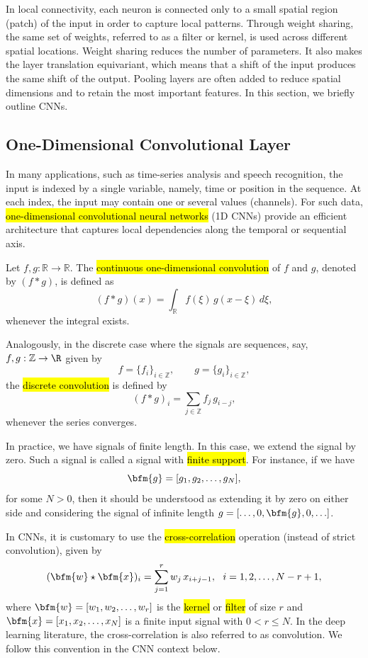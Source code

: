 In local connectivity, each neuron is connected only to a small spatial region (patch) of the input in order to capture local patterns.  Through weight sharing, the same set of weights, referred to as a filter or kernel,  is used across different spatial locations. Weight sharing reduces the number of parameters. It also makes the layer translation equivariant, which means that a shift of the input produces the same shift of the output.  Pooling layers are often added to reduce spatial dimensions and to retain the most important features.  In this section, we briefly outline CNNs.
\subsection{One-Dimensional Convolutional Layer}
In many applications, such as time-series analysis and speech recognition, the input is indexed by a single variable, namely, time or position in the sequence.  At each index, the input may contain one or several values (channels).  For such data, \hl{one-dimensional convolutional neural networks} (1D CNNs) provide an efficient architecture that captures local dependencies along the temporal or sequential axis.

Let $f, g : \mathbb{R} \to \mathbb{R}$. 
The \hl{continuous one-dimensional convolution} of $f$ and $g$, denoted by $(f * g)$, is defined as
$$
(f * g)(x) = \int_{\mathbb{R}} f(\xi)\, g(x - \xi)\, d\xi,
$$
whenever the integral exists.

Analogously, in the discrete case where the signals are sequences, say, $f,g:\mathbb{Z}\rightarrow \R$ given by
$$
f = \{f_i\}_{i \in \mathbb{Z}}, 
\qquad 
g = \{g_i\}_{i \in \mathbb{Z}},
$$
the \hl{discrete convolution} is defined by
$$
(f * g)_i = \sum_{j \in \mathbb{Z}} f_j \, g_{i - j},
$$
whenever the series converges.
\begin{remark}

In practice, we have signals of finite length.  In this case, we extend the signal by zero. Such a signal is called a signal with \hl{finite support}.  For instance, if we have 
$$\bfm{g}=[g_1, g_2, \ldots, g_{N}],$$ 
for some $N>0$, then it should be understood as extending it by zero on either side and considering the signal of infinite length $g=[\ldots, 0, \bfm{g}, 0, \ldots]$.
\end{remark}
In CNNs, it is customary to use the \hl{cross-correlation} operation (instead of strict convolution), given by
$$
(\bfm{w} \star \bfm{x})_i = \sum_{j = 1}^{r}  w_j\, x_{i + j - 1}, ~~
i = 1, 2, \ldots, N - r + 1,
$$
where $\bfm{w} = [w_1, w_2, \ldots, w_{r}]$ is the \hl{kernel} or \hl{filter} of size $r$ and $\bfm{x}=[x_1, x_2, \ldots, x_{N}]$ is a finite input signal with $0 < r \le N$. In the deep learning literature, the cross-correlation is also referred to as convolution. We follow this convention in the CNN context below.

